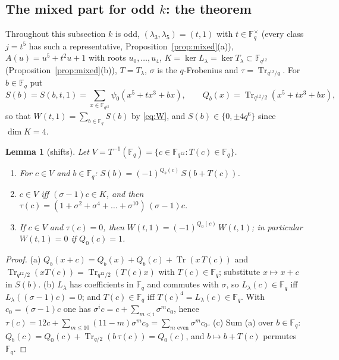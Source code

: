 \documentclass[11pt,a4paper]{amsart}
\newtheorem{lemma}[theorem]{Lemma}
\theoremstyle{definition}
\newcommand{\F}{\mathbb{F}}
\newcommand{\Tr}{\operatorname{Tr}}
\begin{document}
\subsection{The mixed part for odd \texorpdfstring{$k$}{k}: the theorem}\label{subsec:mixedproof}
Throughout this subsection $k$ is odd, $(\lambda_3,\lambda_5)=(t,1)$ with $t\in\F_q^\times$ (every class $j=t^5$ has such a representative, Proposition~\ref{prop:mixed}(a)), $A(u)=u^5+t^2u+1$ with roots $u_0,\dots,u_4$, $K=\ker L_\lambda=\ker T_\lambda\subset\F_{q^{12}}$ (Proposition~\ref{prop:mixed}(b)), $T=T_\lambda$, $\sigma$ is the $q$-Frobenius and $\tau=\Tr_{q^{12}/q}$. For $b\in\F_q$ put
\[
S(b)=S(b,t,1)=\sum_{x\in\F_{q^{12}}}\psi_0(x^5+tx^3+bx),\qquad Q_b(x)=\Tr_{q^{12}/2}(x^5+tx^3+bx),
\]
so that $W(t,1)=\sum_{b\in\F_q}S(b)$ by \eqref{eq:W}, and $S(b)\in\{0,\pm4q^6\}$ since $\dim K=4$.

\begin{lemma}[shifts]\label{lem:shift}
Let $V=T^{-1}(\F_q)=\{c\in\F_{q^{12}}:T(c)\in\F_q\}$.
\begin{enumerate}[label=\textup{(\alph*)},leftmargin=2em]
\item For $c\in V$ and $b\in\F_q$: $S(b)=(-1)^{Q_b(c)}\,S(b+T(c))$.
\item $c\in V$ iff $(\sigma-1)c\in K$, and then $\tau(c)=(1+\sigma^2+\sigma^4+\dots+\sigma^{10})\,(\sigma-1)c$.
\item If $c\in V$ and $\tau(c)=0$, then $W(t,1)=(-1)^{Q_0(c)}\,W(t,1)$; in particular $W(t,1)=0$ if $Q_0(c)=1$.
\end{enumerate}
\end{lemma}
\begin{proof}
(a) $Q_b(x+c)=Q_b(x)+Q_b(c)+\Tr(x\,T(c))$ and $\Tr_{q^{12}/2}(xT(c))=\Tr_{q^{12}/2}(T(c)x)$ with $T(c)\in\F_q$; substitute $x\mapsto x+c$ in $S(b)$. (b) $L_\lambda$ has coefficients in $\F_q$ and commutes with $\sigma$, so $L_\lambda(c)\in\F_q$ iff $L_\lambda((\sigma-1)c)=0$; and $T(c)\in\F_q$ iff $T(c)^4=L_\lambda(c)\in\F_q$. With $c_0=(\sigma-1)c$ one has $\sigma^ic=c+\sum_{m<i}\sigma^mc_0$, hence $\tau(c)=12c+\sum_{m\le10}(11-m)\sigma^mc_0=\sum_{m\text{ even}}\sigma^mc_0$. (c) Sum (a) over $b\in\F_q$: $Q_b(c)=Q_0(c)+\Tr_{q/2}(b\,\tau(c))=Q_0(c)$, and $b\mapsto b+T(c)$ permutes $\F_q$.
\end{proof}
\end{document}

